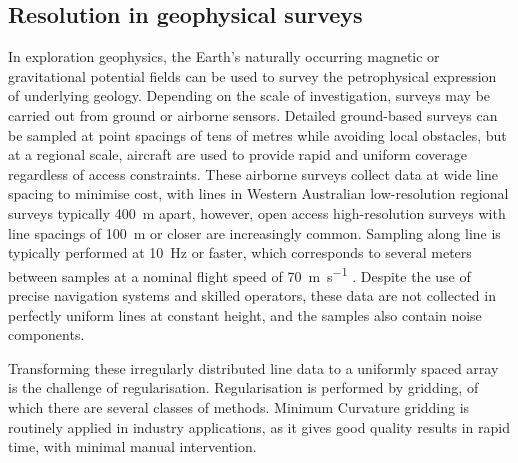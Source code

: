 \documentclass[manuscript.tex]{subfiles}
\begin{document}
\subsection{Resolution in geophysical surveys}
\label{sec:resinsurveys}
In exploration geophysics, the Earth's naturally occurring magnetic or gravitational potential fields can be used to survey the petrophysical expression of underlying geology.
Depending on the scale of investigation, surveys may be carried out from ground or airborne sensors.
Detailed ground-based surveys can be sampled at point spacings of tens of metres while avoiding local obstacles, but at a regional scale, aircraft are used to provide rapid and uniform coverage regardless of access constraints.
These airborne surveys collect data at wide line spacing to minimise cost, with lines in Western Australian low-resolution regional surveys typically \qty{400}{\m} apart, however, open access high-resolution surveys with line spacings of \qty{100}{\m} or closer are increasingly common.
Sampling along line is typically performed at \qty{10}{\Hz} or faster, which corresponds to several meters between samples at a nominal flight speed of \qty{70}{\m\per\s} \parencite{goodwinAirborneMagneticRadiometric2023}.
Despite the use of precise navigation systems and skilled operators, these data are not collected in perfectly uniform lines at constant height, and the samples also contain noise components.

Transforming these irregularly distributed line data to a uniformly spaced array is the challenge of regularisation.
Regularisation is performed by gridding, of which there are several classes of methods.
Minimum Curvature gridding \parencite{briggsMachineContouringUsing1974} is routinely applied in industry applications, as it gives good quality results in rapid time, with minimal manual intervention.
\end{document}
